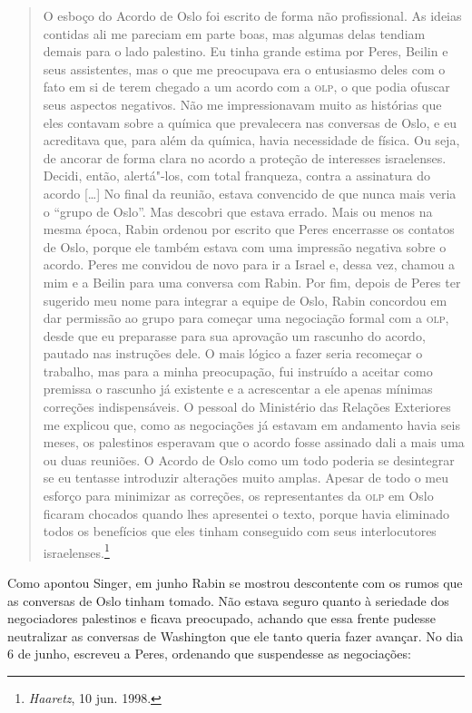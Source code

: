 \begin{quote}
O esboço do Acordo de Oslo foi escrito de forma não profissional. As
ideias contidas ali me pareciam em parte boas, mas algumas delas tendiam
demais para o lado palestino. Eu tinha grande estima por Peres, Beilin e
seus assistentes, mas o que me preocupava era o entusiasmo deles com
o fato em si de terem chegado a um acordo com a \textsc{olp}, o que podia ofuscar seus
aspectos negativos. Não me impressionavam muito as histórias que eles
contavam sobre a química que prevalecera nas conversas de Oslo, e eu
acreditava que, para além da química, havia necessidade de física. Ou
seja, de ancorar de forma clara no acordo a proteção de interesses
israelenses. Decidi, então, alertá"-los, com total franqueza, contra a
assinatura do acordo {[}\ldots{}{]} No final da reunião, estava convencido de que
nunca mais veria o ``grupo de Oslo''. Mas descobri que estava errado.
Mais ou menos na mesma época, Rabin ordenou por escrito que Peres
encerrasse os contatos de Oslo, porque ele também estava com uma
impressão negativa sobre o acordo. Peres me convidou de novo para ir a
Israel e, dessa vez, chamou a mim e a Beilin para uma conversa com
Rabin. Por fim, depois de Peres ter sugerido meu nome para integrar a
equipe de Oslo, Rabin concordou em dar permissão ao grupo para começar
uma negociação formal com a \textsc{olp}, desde que eu preparasse para sua
aprovação um rascunho do acordo, pautado nas instruções dele. O mais
lógico a fazer seria recomeçar o trabalho, mas para a minha preocupação,
fui instruído a aceitar como premissa o rascunho já existente e a
acrescentar a ele apenas mínimas correções indispensáveis. O pessoal do
Ministério das Relações Exteriores me explicou que, como as negociações
já estavam em andamento havia seis meses, os palestinos esperavam que o
acordo fosse assinado dali a mais uma ou duas reuniões. O Acordo de Oslo
como um todo poderia se desintegrar se eu tentasse introduzir alterações
muito amplas. Apesar de todo o meu esforço para minimizar as correções,
os representantes da \textsc{olp} em Oslo ficaram chocados quando lhes apresentei
o texto, porque havia eliminado todos os benefícios que eles tinham
conseguido com seus interlocutores israelenses.\footnote{\emph{Haaretz},
  10 jun. 1998.}
\end{quote}

Como apontou Singer, em junho Rabin se mostrou descontente com os rumos
que as conversas de Oslo tinham tomado. Não estava seguro quanto à
seriedade dos negociadores palestinos e ficava preocupado, achando que
essa frente pudesse neutralizar as conversas de Washington que ele tanto
queria fazer avançar. No dia 6 de junho, escreveu a Peres, ordenando que
suspendesse as negociações:

